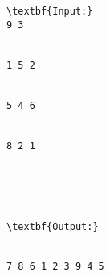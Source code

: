 \begin{verbatim}
\textbf{Input:}
9 3


1 5 2


5 4 6


8 2 1





\textbf{Output:}


7 8 6 1 2 3 9 4 5 \end{verbatim}